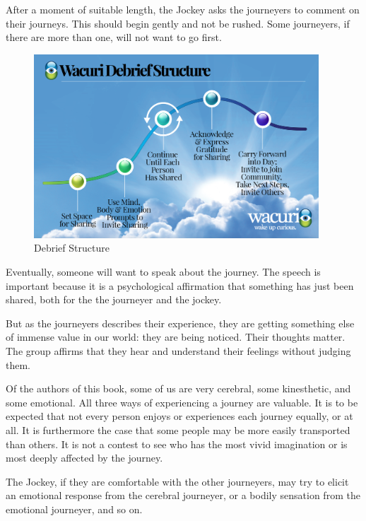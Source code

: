 \documentclass[12pt]{book}
\begin{document}
After a moment of suitable length, the Jockey asks the journeyers to comment on their journeys. This should begin gently and not be rushed. Some journeyers, if there are more than one, will not want to go first.

\begin{figure}
  \centering
     \includegraphics[width=0.95\textwidth]{WacuriFigures/Wacuri-Debrief-Structure.png}
     \caption{Debrief Structure}
  \label{fig:debrief}     
\end{figure}

Eventually, someone will want to speak about the journey. The speech is important because it is a psychological affirmation that something has just been shared, both for the the journeyer and the jockey.
					
But as the journeyers describes their experience, they are getting something else of immense value in our world: they are being noticed. Their thoughts matter. The group affirms that they hear and understand their feelings without judging them.
					
Of the authors of this book, some of us are very cerebral, some kinesthetic, and some emotional. All three ways of experiencing a journey are valuable. It is to be expected that not every person enjoys or experiences each journey equally, or at all. It is furthermore the case that some people may be more easily transported than others.
It is not a contest to see who has the most vivid imagination or is most deeply affected by the journey.
					
The Jockey, if they are comfortable with the other journeyers, may try to elicit an emotional response from the cerebral journeyer, or a bodily sensation from the emotional journeyer, and so on.
					
\end{document}
